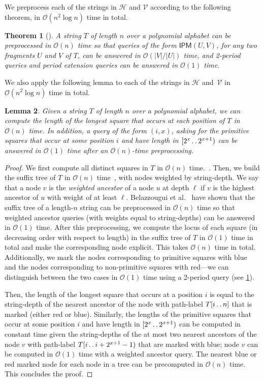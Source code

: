 \documentclass[11pt,letterpaper]{article}
\newcommand{\cO}{\mathcal{O}}
\def\dd{\mathinner{.\,.}}
\newcommand{\IPM}{\textsf{IPM}}
\newtheorem{theorem}{Theorem}[section]
\newtheorem{lemma}[theorem]{Lemma}
\begin{document}
We preprocess each of the strings in $\mathcal{H}$ and $\mathcal{V}$ according to the following theorem, in $\cO(n^2 \log n)$ time in total.

\begin{theorem}[\cite{DBLP:conf/soda/KociumakaRRW15,tomeksthesis}]\label{thm:IPM}
A string $T$ of length $n$ over a polynomial alphabet can be preprocessed in $\cO(n)$ time so that queries of the form $\IPM(U,V)$, for any two fragments $U$ and $V$ of $T$, can be answered in $\cO(|V|/|U|)$ time, and 2-period queries and period extension queries can be answered in $\cO(1)$ time.
\end{theorem}


We also apply the following lemma to each of the strings in $\mathcal{H}$ and~$\mathcal{V}$ in $\cO(n^2 \log n)$ time in total.

\begin{lemma}\label{lem:long_sq}
Given a string $T$ of length $n$ over a polynomial alphabet, we can compute the length of the longest square that occurs at each position of $T$ in $\cO(n)$ time.
In addition, a query of the form $(i,x)$, asking for the primitive squares that occur at some position $i$ and have length in $[2^x \dd 2^{x+1})$ can be answered in $\cO(1)$ time after an $\cO(n)$-time preprocessing.
\end{lemma}
\begin{proof}
We first compute all distinct squares in $T$ in $\cO(n)$ time.~\cite{BannaiIK17,CrochemoreIKRRW14}.
Then, we build the suffix tree of $T$ in $\cO(n)$ time~\cite{DBLP:conf/focs/Farach97}, with nodes weighted by string-depth.
We say that a node $v$ is the \emph{weighted ancestor} of a node $u$ at depth $\ell$ if $v$ is the highest ancestor of $u$ with weight of at least $\ell$.
Belazzougui et al.~\cite{DBLP:conf/cpm/BelazzouguiKPR21} have shown that the suffix tree of a length-$n$ string can be preprocessed in $\cO(n)$ time so that weighted ancestor queries (with weights equal to string-depths) can be answered in $\cO(1)$ time.
After this preprocessing, we compute the locus of each square (in decreasing order with respect to length) in the suffix tree of $T$ in $\cO(1)$ time in total and make the corresponding node explicit. This takes $\cO(n)$ time in total.
Additionally, we mark the nodes corresponding to primitive squares with blue and the nodes corresponding to non-primitive squares with red---we can distinguish between the two cases in $\cO(1)$ time using a 2-period query (see \cref{thm:IPM}).

Then, the length of the longest square that occurs at a position $i$ is equal to the string-depth of the nearest ancestor of the node with path-label $T[i \dd n]$ that is marked (either red or blue).
Similarly, the lengths of the primitive squares that occur at some position $i$ and have length in $[2^x \dd 2^{x+1})$ can be computed in constant time given the string-depths of the at most two nearest ancestors of the node $v$ with path-label $T[i \dd i+2^{x+1}-1)$ that are marked with blue; node $v$ can be computed in $\cO(1)$ time with a weighted ancestor query.
The nearest blue or red marked node for each node in a tree can be precomputed in $\cO(n)$ time. This concludes the proof.
\end{proof}
\end{document}

